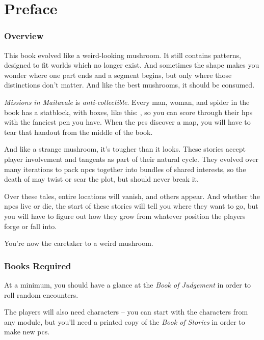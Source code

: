 \chapter{Preface}

\begin{multicols}{2}

\subsection*{Overview}

This book evolved like a weird-looking mushroom.
It still contains patterns, designed to fit worlds which no longer exist.
And sometimes the shape makes you wonder where one part ends and a segment begins, but only where those distinctions don't matter.
And like the best mushrooms, it should be consumed.

\textit{Missions in Maitavale} is \emph{anti-collectible}.
Every man, woman, and spider in the book has a statblock, with  boxes, like this: \setcounter{wounds}{2} \setcounter{freeHP}{3}\hpStat, so you can score through their \glspl{hp} with the fanciest pen you have.
When the \glspl{pc} discover a map, you will have to tear that handout from the middle of the book.
\setcounter{wounds}{0}

And like a strange mushroom, it's tougher than it looks.
These stories accept player involvement and tangents as part of their natural cycle.
They evolved over many iterations to pack \glspl{npc} together into bundles of shared interests, so the death of  may twist or scar the plot, but should never break it.

Over these tales, entire locations will vanish, and others appear.
And whether the \glspl{npc} live or die, the start of these stories will tell you where they want to go, but you will have to figure out how they grow from whatever position the players forge or fall into.

You're now the caretaker to a weird mushroom.

\subsection*{Books Required}

At a minimum, you should have a glance at the \textit{Book of Judgement} in order to roll random encounters.

The players will also need characters -- you can start with the characters from any module, but you'll need a printed copy of the \textit{Book of Stories} in order to make new \glspl{pc}.


\end{multicols}
